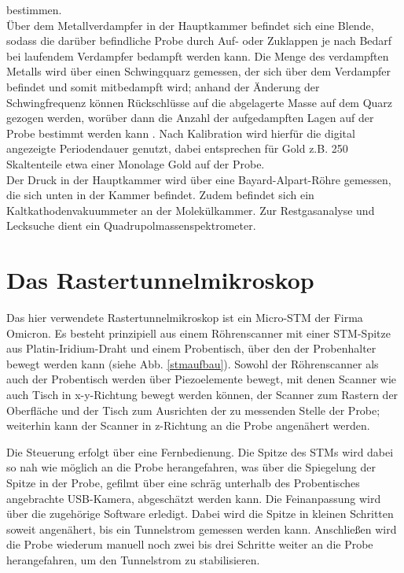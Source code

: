 bestimmen.\\
 Über dem Metallverdampfer in der Hauptkammer befindet sich eine
Blende, sodass die darüber befindliche Probe durch Auf- oder Zuklappen je nach Bedarf bei
laufendem Verdampfer bedampft werden kann. Die Menge des verdampften Metalls wird über einen
Schwingquarz gemessen, der sich über dem Verdampfer befindet und somit mitbedampft wird; anhand der
Änderung der Schwingfrequenz können Rückschlüsse auf die abgelagerte Masse auf dem Quarz gezogen
werden, worüber dann die Anzahl der aufgedampften Lagen auf der Probe bestimmt werden kann
\cite{Sau}.
Nach Kalibration wird hierfür die digital angezeigte Periodendauer genutzt, dabei entsprechen für
Gold z.B. 250 Skaltenteile etwa einer Monolage Gold auf der Probe.\\
Der Druck in der Hauptkammer wird über eine Bayard-Alpart-Röhre gemessen, die sich unten in der
Kammer befindet. Zudem befindet sich ein Kaltkathodenvakuummeter %
an der Molekülkammer.
Zur Restgasanalyse und Lecksuche dient ein Quadrupolmassenspektrometer.%


\section{Das Rastertunnelmikroskop}

Das hier verwendete Rastertunnelmikroskop ist ein Micro-STM der Firma Omicron. Es besteht
prinzipiell aus einem Röhrenscanner mit einer STM-Spitze aus Platin-Iridium-Draht und einem
Probentisch, über den der Probenhalter bewegt werden kann (siehe Abb. \ref{stmaufbau}). Sowohl der
Röhren\-scanner als auch der Probentisch werden über Piezoelemente bewegt, mit denen Scanner
wie auch Tisch in x-y-Richtung bewegt werden können, der Scanner zum Rastern der Oberfläche und der
Tisch zum Ausrichten der zu messenden Stelle der Probe; weiterhin kann der Scanner in z-Richtung an
die Probe angenähert werden.

Die Steuerung erfolgt über eine Fernbedienung.
Die Spitze des STMs wird dabei so nah wie möglich an die Probe herangefahren, was über die
Spiegelung der Spitze in der Probe, gefilmt über eine schräg unterhalb des Probentisches angebrachte
USB-Kamera, abgeschätzt werden kann. Die Feinanpassung wird über die zugehörige Software erledigt.
Dabei wird die Spitze in kleinen Schritten soweit angenähert, bis ein Tunnelstrom gemessen werden
kann. Anschließen wird die Probe wiederum manuell noch zwei bis drei Schritte weiter an die Probe
herangefahren, um den Tunnelstrom zu stabilisieren.\\

